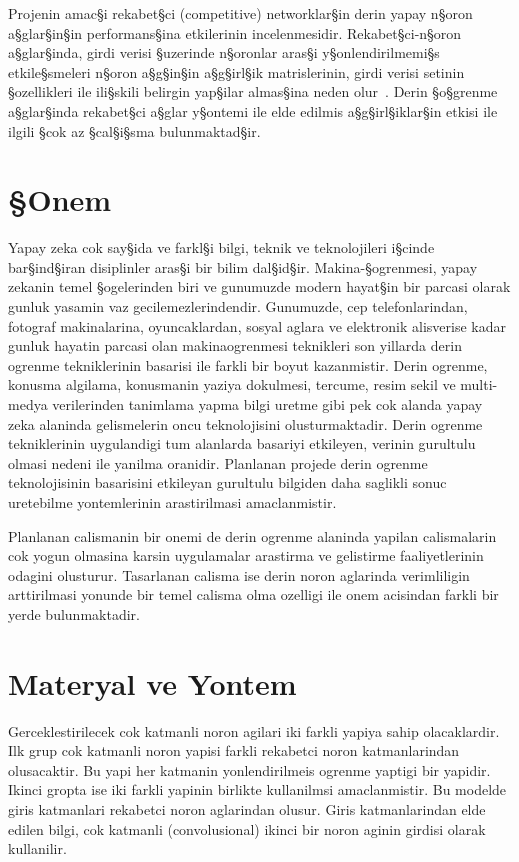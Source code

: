 Projenin amac§i rekabet§ci (competitive) networklar§in derin yapay n§oron
a§glar§in§in performans§ina etkilerinin incelenmesidir. Rekabet§ci-n§oron
a§glar§inda, girdi verisi §uzerinde n§oronlar aras§i y§onlendirilmemi§s
etkile§smeleri n§oron a§g§in§in a§g§irl§ik matrislerinin, girdi verisi setinin
§ozellikleri ile ili§skili belirgin yap§ilar almas§ina neden olur~\cite{Rumelhart:1985}.  Derin
§o§grenme a§glar§inda rekabet§ci a§glar y§ontemi ile elde edilmis
a§g§irl§iklar§in etkisi ile ilgili §cok az §cal§i§sma bulunmaktad§ir.

\section*{§Onem}

Yapay zeka cok say§ida ve farkl§i bilgi, teknik ve teknolojileri i§cinde
bar§ind§iran disiplinler aras§i bir bilim dal§id§ir. Makina-§ogrenmesi,
yapay zekanin temel §ogelerinden biri ve gunumuzde modern hayat§in bir
parcasi olarak gunluk yasamin vaz gecilemezlerindendir. Gunumuzde, cep
telefonlarindan, fotograf makinalarina, oyuncaklardan, sosyal aglara
ve elektronik alisverise kadar gunluk hayatin parcasi olan
makinaogrenmesi teknikleri son yillarda derin ogrenme tekniklerinin
basarisi ile farkli bir boyut kazanmistir.  Derin ogrenme, konusma
algilama, konusmanin yaziya dokulmesi, tercume, resim sekil ve
multi-medya verilerinden tanimlama yapma bilgi uretme gibi pek cok
alanda yapay zeka alaninda gelismelerin oncu teknolojisini
olusturmaktadir. Derin ogrenme tekniklerinin uygulandigi tum alanlarda
basariyi etkileyen, verinin gurultulu olmasi nedeni ile yanilma
oranidir. Planlanan projede derin ogrenme teknolojisinin basarisini
etkileyan gurultulu bilgiden daha saglikli sonuc uretebilme
yontemlerinin arastirilmasi amaclanmistir.

Planlanan calismanin bir onemi de derin ogrenme alaninda yapilan
calismalarin cok yogun olmasina karsin uygulamalar arastirma ve
gelistirme faaliyetlerinin odagini olusturur. Tasarlanan calisma ise
derin noron aglarinda verimliligin arttirilmasi yonunde bir temel
calisma olma ozelligi ile onem acisindan farkli bir yerde
bulunmaktadir.

\section{Materyal ve Yontem}

Gerceklestirilecek cok katmanli noron agilari iki farkli yapiya sahip
olacaklardir. Ilk grup cok katmanli noron yapisi farkli rekabetci
noron katmanlarindan olusacaktir. Bu yapi her katmanin yonlendirilmeis
ogrenme yaptigi bir yapidir. Ikinci gropta ise iki farkli yapinin
birlikte kullanilmsi amaclanmistir. Bu modelde giris katmanlari
rekabetci noron aglarindan olusur. Giris katmanlarindan elde edilen
bilgi, cok katmanli (convolusional) ikinci bir noron aginin girdisi
olarak kullanilir.


